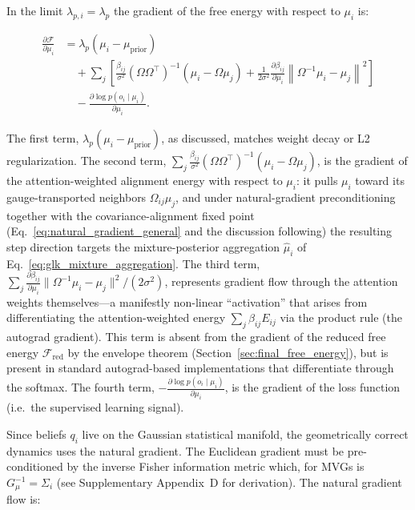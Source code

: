 \documentclass[twoside,11pt]{article}
\begin{document}
In the limit $\lambda_{p,i} = \lambda_p$ the gradient of the free energy with respect to $\mu_i$ is:

\begin{equation}
\boxed{
\begin{aligned}
\frac{\partial \mathcal{F}}{\partial \mu_i}
&= \lambda_p \left(\mu_i - \mu_{\text{prior}}\right) \\
&\quad + \sum_j \left[
  \frac{\beta_{ij}}{\sigma^2}(\Omega\Omega^\top)^{-1}\left(\mu_i - \Omega\mu_j\right)
  + \frac{1}{2\sigma^2}
  \frac{\partial \beta_{ij}}{\partial \mu_i}
  \left\|\Omega^{-1}\mu_i - \mu_j\right\|^2
\right] \\
&\quad - \frac{\partial \log p(o_i \mid \mu_i)}{\partial \mu_i}.
\end{aligned}
}
\end{equation}

The first term, $\lambda_p(\mu_i - \mu_{\text{prior}})$, as discussed, matches weight decay or L2 regularization. The second term, $\sum_j \frac{\beta_{ij}}{\sigma^2}(\Omega\Omega^\top)^{-1}(\mu_i - \Omega\mu_j)$, is the gradient of the attention-weighted alignment energy with respect to $\mu_i$: it pulls $\mu_i$ toward its gauge-transported neighbors $\Omega_{ij}\mu_j$, and under natural-gradient preconditioning together with the covariance-alignment fixed point (Eq.~\ref{eq:natural_gradient_general} and the discussion following) the resulting step direction targets the mixture-posterior aggregation $\hat\mu_i$ of Eq.~\ref{eq:glk_mixture_aggregation}. The third term, $\sum_j \frac{\partial \beta_{ij}}{\partial \mu_i}\|\Omega^{-1}\mu_i - \mu_j\|^2/(2\sigma^2)$, represents gradient flow through the attention weights themselves---a manifestly non-linear ``activation'' that arises from differentiating the attention-weighted energy $\sum_j \beta_{ij} E_{ij}$ via the product rule (the autograd gradient). This term is absent from the gradient of the reduced free energy $\mathcal{F}_{\mathrm{red}}$ by the envelope theorem (Section~\ref{sec:final_free_energy}), but is present in standard autograd-based implementations that differentiate through the softmax. The fourth term, $-\frac{\partial \log p(o_i \mid \mu_i)}{\partial \mu_i}$, is the gradient of the loss function (i.e.\ the supervised learning signal).

Since beliefs $q_i$ live on the Gaussian statistical manifold, the geometrically correct dynamics uses the natural gradient. The Euclidean gradient must be pre-conditioned by the inverse Fisher information metric which, for MVGs is $G_\mu^{-1} = \Sigma_i$ (see Supplementary Appendix~D for derivation). The natural gradient flow is:
\end{document}
